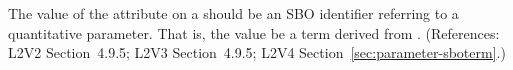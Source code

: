 The value of the  attribute on a \Parameter should be an SBO
identifier referring to a quantitative parameter.  That is, the value 
be a term derived from \sboparameter.  (References: L2V2 Section~4.9.5; L2V3
Section~4.9.5; L2V4 Section~\ref{sec:parameter-sboterm}.)
